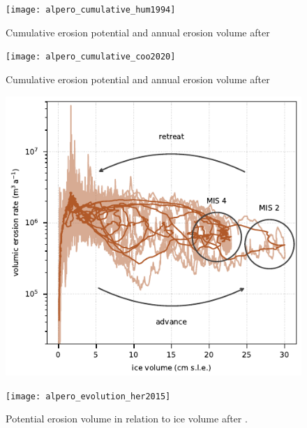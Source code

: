 \documentclass[esurf]{copernicus}
\begin{document}
    \begin{figure}
      \texttt{[image: alpero\_cumulative\_hum1994]}
      \caption{%
        Cumulative erosion potential and annual erosion volume after
        \citet{Humphrey.Raymond.1994}}
    \end{figure}

    \begin{figure}
      \texttt{[image: alpero\_cumulative\_coo2020]}
      \caption{%
        Cumulative erosion potential and annual erosion volume after
        \citet{Cook.etal.2020}}
    \end{figure}

    \begin{figure}
      \begin{minipage}[t]{85mm}
      \includegraphics{alpero_evolution}
      \caption[%
        Potential erosion volume in relation to ice volume after
        \citet{Koppes.etal.2015}, same as main text Fig. 2.
      ]{%
        Modelled annual (domain-integrated) potential erosion volume (light
        curves) and its 1-ka running mean (dark curves) in relation to the
        modelled total ice volume in centimetres of sea-level equivalent. Blue
        indicates increasing ice volume and brown decreasing ice volume.
        After \citet{Koppes.etal.2015}, same as main text Fig. 2.}
      \end{minipage}
      \hfill
      \begin{minipage}[t]{85mm}
      \texttt{[image: alpero\_evolution\_her2015]}
      \caption{%
        Potential erosion volume in relation to ice volume after
        \citet{Herman.etal.2015}.}
      \end{minipage}
    \end{figure}
\end{document}
